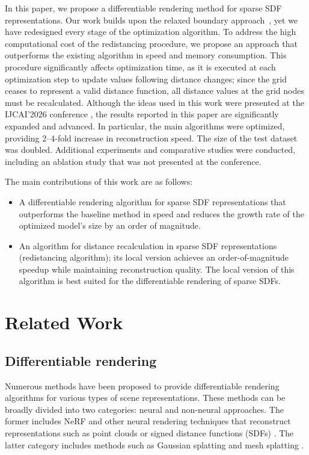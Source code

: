 \documentclass{ieeeaccess}
\begin{document}
In this paper, we propose a differentiable rendering method for sparse SDF representations. Our work builds upon the relaxed boundary approach~\cite{RelaxBoundary}, yet we have redesigned every stage of the optimization algorithm. To address the high computational cost of the redistancing procedure, we propose an approach that outperforms the existing algorithm in speed and memory consumption. This procedure significantly affects optimization time, as it is executed at each optimization step to update values following distance changes; since the grid ceases to represent a valid distance function, all distance values at the grid nodes must be recalculated. Although the ideas used in this work were presented at the IJCAI'2026 conference \cite{ijcai2026}, the results reported in this paper are significantly expanded and advanced. In particular, the main algorithms were optimized, providing 2–4-fold increase in reconstruction speed. The size of the test dataset was doubled. Additional experiments and comparative studies were conducted, including an ablation study that was not presented at the conference.

The main contributions of this work are as follows:

\begin{itemize}
    \item A differentiable rendering algorithm for sparse SDF representations that outperforms the baseline method in speed and reduces the growth rate of the optimized model's size by an order of magnitude.
    \item An algorithm for distance recalculation in sparse SDF representations (redistancing algorithm); its local version achieves an order-of-magnitude speedup while maintaining reconstruction quality. The local version of this algorithm is best suited for the differentiable rendering of sparse SDFs. 
\end{itemize}

\section{Related Work}

\subsection{Differentiable rendering}

Numerous methods have been proposed to provide differentiable rendering algorithms for various types of scene representations. These methods can be broadly divided into two categories: neural and non-neural approaches. The former includes NeRF \cite{NeRF} and other neural rendering techniques that reconstruct representations such as point clouds or signed distance functions (SDFs) \cite{NeUS2, NeuAngelo}. The latter category includes methods such as Gaussian splatting \cite{3DGS, 2DGS} and mesh splatting \cite{MeshS}.
\end{document}

